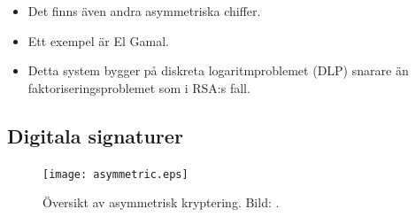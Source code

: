 \documentclass{beamer}
\theoremstyle{definition}
\begin{document}

\begin{frame}{\insertsubsectionhead}
  \begin{itemize}
    \item Det finns även andra asymmetriska chiffer.
    \item Ett exempel är El Gamal.
    \item Detta system bygger på diskreta logaritmproblemet (DLP) snarare än 
      faktoriseringsproblemet som i RSA:s fall.
  \end{itemize}
\end{frame}


\subsection{Digitala signaturer}

\begin{frame}{\insertsubsectionhead}
  \begin{figure}
    \texttt{[image: asymmetric.eps]}
    \caption{Översikt av asymmetrisk kryptering.
      Bild: \cite{Stallings2011can}.}
  \end{figure}
\end{frame}

%
%
\end{document}
